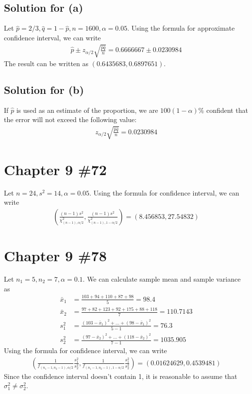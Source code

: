 \documentclass{scrartcl}
\begin{document}
\subsection{Solution for (a)}
Let \(\hat{p} = 2 / 3, \hat{q} = 1 - \hat{p}, n = 1600, \alpha = 0.05\). Using
the formula for approximate confidence interval, we can write
\begin{align*}
  \hat{p} \pm z_{\alpha / 2} \sqrt{\frac{\hat{p} \hat{q}}{n}}
  = 0.6666667 \pm 0.0230984
\end{align*}
The result can be written as \((0.6435683, 0.6897651)\).

\subsection{Solution for (b)}
If \(\hat{p}\) is used as an estimate of the proportion, we are \(100(1 -
\alpha)\%\) confident that the error will not exceed the following value:
\begin{align*}
  z_{\alpha / 2} \sqrt{\frac{\hat{p} \hat{q}}{n}}
  = 0.0230984
\end{align*}

\section{Chapter 9 \#72}
Let \(n = 24, s^2 = 14, \alpha = 0.05\). Using the formula for confidence
interval, we can write
\begin{align*}
  \left( \frac{(n - 1) s^2}{\chi^2_{(n - 1), \alpha / 2}},
    \frac{(n - 1) s^2}{\chi^2_{(n - 1), 1 - \alpha / 2}} \right)
  = (8.456853, 27.54832)
\end{align*}

\section{Chapter 9 \#78}
Let \(n_1 = 5, n_2 = 7, \alpha = 0.1\). We can calculate sample mean and sample
variance as
\begin{align*}
  \bar{x}_1
  &= \frac{103 + 94 + 110 + 87 + 98}{5}
  = 98.4 \\
  \bar{x}_2
  &= \frac{97 + 82 + 123 + 92 + 175 + 88 + 118}{7}
  = 110.7143 \\
  s_1^2
  &= \frac{(103 - \bar{x}_1)^2 + \dots + (98 - \bar{x}_1)^2}{5 - 1}
  = 76.3 \\
  s_2^2
  &= \frac{(97 - \bar{x}_2)^2 + \dots + (118 - \bar{x}_2)^2}{7 - 1}
  = 1035.905
\end{align*}
Using the formula for confidence interval, we can write
\begin{align*}
  \left( \frac{1}{f_{(n_1 - 1, n_2 - 1), \alpha / 2}}
    \frac{s^2_1}{s^2_2},
    \frac{1}{f_{(n_1 - 1, n_2 - 1), 1 - \alpha / 2}}
    \frac{s^2_1}{s^2_2} \right)
  = (0.01624629, 0.4539481)
\end{align*}
Since the confidence interval doesn't contain 1, it is reasonable to assume
that \(\sigma^2_1 \not = \sigma^2_2\).
\end{document}
